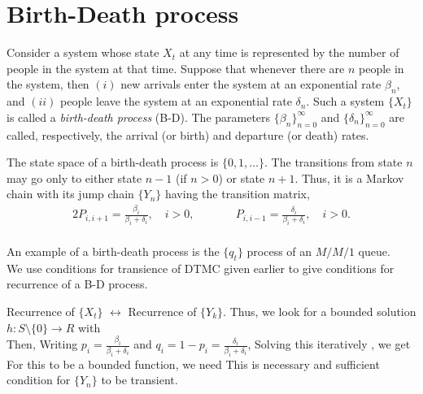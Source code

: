 \documentclass[all-lectures.tex]{subfiles}
\begin{document}

\setcounter{section}{5}
\setcounter{subsection}{0}

\section*{}
\chr
\section{Birth-Death process}
Consider a system whose state $X_t$ at any time is represented by the number of people
in the system at that time. 
Suppose that whenever there are $n$ people in the system,
then $(i)$ new arrivals enter the system at an exponential rate $\beta_n$, and $(ii)$ people
leave the system at an exponential rate $\delta_n$. 
Such a system $\{X_t\}$ is called a \textit{birth-death process} (B-D). The parameters $\{\beta_n\}^{\infty}_{n=0}$ and $\{\delta_n\}^{\infty}_{n=0}$ are called, respectively, the
arrival (or birth) and departure (or death) rates.

The state space of a birth-death process is $\{0,1, \dots\}$.
The transitions from state $n$ may go only to either state $n-1$ (if $n>0$) or
state $n + 1$. 
Thus, it is a Markov chain with its jump chain $\{Y_n\}$ having the transition matrix,
\begin{alignat*}{2}
P_{i,i+1} = \frac{\beta_i}{\beta_i+\delta_i}, \quad i>0, && \quad  \quad  P_{i,i-1} = \frac{\delta_i}{\beta_i+\delta_i},  \quad i>0.
\end{alignat*}
\\

An example of a birth-death process is the $\{q_t\}$ process of an $M/M/1$ queue. \\
We use conditions for transience of DTMC given earlier to give conditions for recurrence of a B-D process.

Recurrence of $\{X_t\}$ $\leftrightarrow $ Recurrence of $\{Y_k\}$.
Thus, we look for a bounded solution $h:S\setminus\{0\} \to R$ with
\\
Then,
Writing $p_i = \frac{\beta_i}{\beta_i + \delta_i}$ and $q_i=1-p_i = \frac{\delta_i}{\beta_i + \delta_i}$,
Solving this iteratively , we get
For this to be a bounded function, we need
This is necessary and sufficient condition for $\{Y_n\}$ to be transient.
\end{document}
